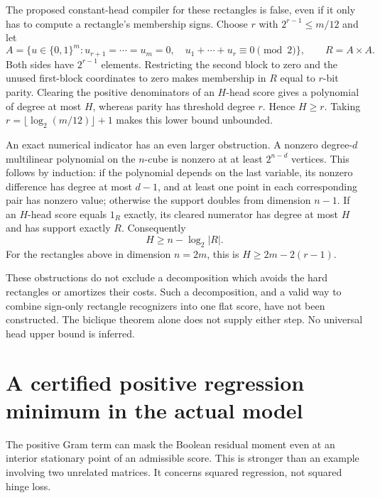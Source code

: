 \documentclass[11pt]{article}
\begin{document}
The proposed constant-head compiler for these rectangles is false,
even if it only has to compute a rectangle's membership signs.
Choose $r$ with $2^{r-1}\le m/12$ and let
\[
 A=\{u\in\{0,1\}^m:u_{r+1}=\cdots=u_m=0,
             \quad u_1+\cdots+u_r\equiv0\pmod2\},
 \qquad R=A\times A.
\]
Both sides have $2^{r-1}$ elements. Restricting the second block to zero
and the unused first-block coordinates to zero makes membership in
$R$ equal to $r$-bit parity. Clearing the positive denominators of an
$H$-head score gives a polynomial of degree at most $H$, whereas
parity has threshold degree $r$. Hence $H\ge r$. Taking
$r=\lfloor\log_2(m/12)\rfloor+1$ makes this lower bound unbounded.

An exact numerical indicator has an even larger obstruction. A
nonzero degree-$d$ multilinear polynomial on the $n$-cube is nonzero
at at least $2^{n-d}$ vertices. This follows by induction: if the
polynomial depends on the last variable, its nonzero difference has
degree at most $d-1$, and at least one point in each corresponding
pair has nonzero value; otherwise the support doubles from dimension
$n-1$. If an $H$-head score equals $1_R$ exactly, its cleared numerator
has degree at most $H$ and has support exactly $R$. Consequently
\[
 H\ge n-\log_2|R|.
\]
For the rectangles above in dimension $n=2m$, this is
$H\ge2m-2(r-1)$.

These obstructions do not exclude a decomposition which avoids the
hard rectangles or amortizes their costs. Such a decomposition, and
a valid way to combine sign-only rectangle recognizers into one flat
score, have not been constructed. The biclique theorem alone does
not supply either step. No universal head upper bound is inferred.


\section{A certified positive regression minimum in the actual model}

The positive Gram term can mask the Boolean residual moment even at an
interior stationary point of an admissible score. This is stronger than
an example involving two unrelated matrices. It concerns squared
regression, not squared hinge loss.
\end{document}
